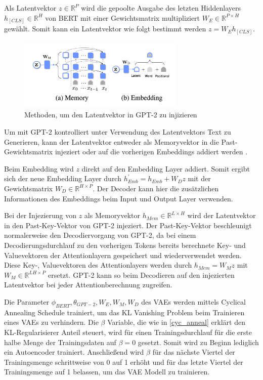 Als Latentvektor $z \in \mathbb{R}^P$ wird die gepoolte Ausgabe des letzten Hiddenlayers $h_{[CLS]} \in \mathbb{R}^H$ von BERT mit einer Gewichtsmatrix multipliziert $W_{E} \in \mathbb{R}^{P\times H}$ gewählt. Somit kann ein Latentvektor wie folgt bestimmt werden $z = W_{E}h_{[CLS]}$.

\begin{figure}[h]
    \centering
    \includegraphics[width=8cm]{bilder/latent_optimus}
    \caption{Methoden, um den Latentvektor in GPT-2 zu injizieren \citep{DBLP:journals/corr/abs-2004-04092}}
    \label{latent_optimus}
\end{figure}

Um mit GPT-2 kontrolliert unter Verwendung des Latentvektors Text zu Generieren, kann der Latentvektor entweder als Memoryvektor in die Past-Gewichtsmatrix injeziert oder auf die vorherigen Embeddings addiert werden \citep{DBLP:journals/corr/abs-2004-04092}.

Beim Embedding wird $z$ direkt auf den Embedding Layer addiert. Somit ergibt sich der neue Embedding Layer durch $h_{Emb}^{'} = h_{Emb} + W_D z$ mit der Gewichtsmatrix $W_D \in \mathbb{R}^{H \times P}$.
Der Decoder kann hier die zusätzlichen Informationen des Embeddings beim Input und Output Layer verwenden.

Bei der Injezierung von $z$ als Memoryvektor $h_{Mem} \in \mathbb{R}^{L\times H}$ wird der Latentvektor in den Past-Key-Vektor von GPT-2 injeziert. 
Der Past-Key-Vektor beschleunigt normalerweise den Decodiervorgang von GPT-2, da bei einem Decodierungsdurchlauf zu den vorherigen Tokens bereits berechnete Key- und Valuevektoren der Attentionlayern gespeichert und wiederverwendet werden.
Diese Key-, Valuevektoren des Attentionlayers werden durch $h_{Mem} = W_M z$ mit $W_M \in \mathbb{R}^{LH \times P}$ ersetzt. GPT-2 kann so beim Decodieren auf den injezierten Latentvektor bei jeder Attentionberechnung zugreifen.

Die Parameter ${\phi_{BERT}, \theta_{GPT-2}, W_E,W_M,W_D}$ des VAEs werden mittels Cyclical Annealing Schedule \citep{cyc_anneal} trainiert, um das KL Vanishing Problem beim Trainieren eines VAEs zu verhindern.
Die $\beta$ Variable, die wie in \ref{cyc_anneal} erklärt den KL-Regularisierer Anteil steuert, wird für einen Trainingsdurchlauf für die erste halbe Menge der Trainingsdaten auf $\beta = 0$ gesetzt. Somit wird zu Beginn lediglich ein Autoencoder trainiert. 
Anschließend wird $\beta$ für das nächste Viertel der Trainingsmenge schrittweise von 0 auf 1 erhöht und für das letzte Viertel der Trainingsmenge auf 1 belassen, um das VAE Modell zu trainieren.

